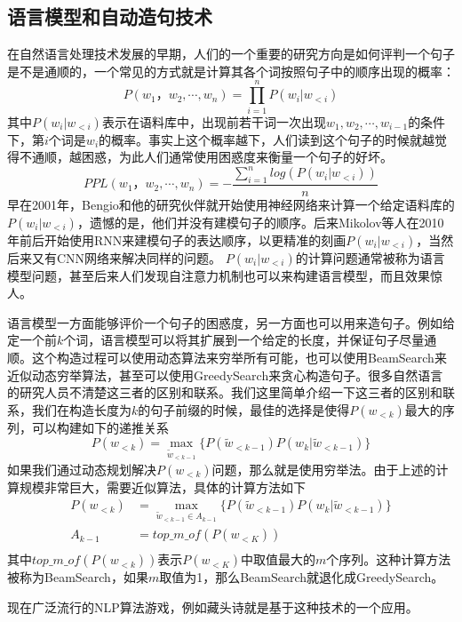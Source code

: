 \documentclass[twoside,a4paper,12pt]{book}%
\begin{document}
\subsection{语言模型和自动造句技术}
在自然语言处理技术发展的早期，人们的一个重要的研究方向是如何评判一个句子是不是通顺的，一个常见的方式就是计算其各个词按照句子中的顺序出现的概率：
$$
P(w_1，w_2,\cdots,w_n) = \prod_{i=1}^{n}{P(w_i|w_{<i})}
$$
其中$P(w_i|w_{<i})$表示在语料库中，出现前若干词一次出现$w_1,w_2,\cdots,w_{i-1}$的条件下，第$i$个词是$w_i$的概率。事实上这个概率越下，人们读到这个句子的时候就越觉得不通顺，越困惑，为此人们通常使用困惑度来衡量一个句子的好坏。
$$
PPL(w_1，w_2,\cdots,w_n) = -\frac{\sum_{i=1}^{n}log(P(w_i|w_{<i}))}{n}
$$
早在2001年，Bengio和他的研究伙伴就开始使用神经网络来计算一个给定语料库的$P(w_i|w_{<i})$，遗憾的是，他们并没有建模句子的顺序。后来Mikolov等人在2010年前后开始使用\gls{RNN}来建模句子的表达顺序，以更精准的刻画$P(w_i|w_{<i})$，当然后来又有\gls{CNN}网络来解决同样的问题。
$P(w_i|w_{<i})$的计算问题通常被称为语言模型问题，甚至后来人们发现自注意力机制也可以来构建语言模型，而且效果惊人。

语言模型一方面能够评价一个句子的困惑度，另一方面也可以用来造句子。例如给定一个前$k$个词，语言模型可以将其扩展到一个给定的长度，并保证句子尽量通顺。这个构造过程可以使用动态算法来穷举所有可能，也可以使用BeamSearch来近似动态穷举算法，甚至可以使用GreedySearch来贪心构造句子。很多自然语言的研究人员不清楚这三者的区别和联系。我们这里简单介绍一下这三者的区别和联系，我们在构造长度为$k$的句子前缀的时候，最佳的选择是使得$P(w_{<k})$最大的序列，可以构建如下的递推关系
$$
P(w_{<{k}}) =\max_{\widetilde{w}_{<{k-1}}}\{P(\widetilde{w}_{<{k-1}})P(w_k|\widetilde{w}_{<{k-1}})\} 
$$
如果我们通过动态规划解决$P(w_{<k})$问题，那么就是使用穷举法。由于上述的计算规模非常巨大，需要近似算法，具体的计算方法如下
$$
\begin{aligned}
P(w_{<{k}}) &=\max_{\widetilde{w}_{<{k-1}}\in A_{k-1}}\{P(\widetilde{w}_{<{k-1}})P(w_k|\widetilde{w}_{<{k-1}})\} \\
A_{k-1} &=top\_m\_of(P(w_{<K}))\\
\end{aligned}
$$
其中$top\_m\_of(P(w_{<k}))$表示$P(w_{<K})$中取值最大的$m$个序列。这种计算方法被称为BeamSearch，如果$m$取值为1，那么BeamSearch就退化成GreedySearch。


现在广泛流行的\gls{NLP}算法游戏，例如藏头诗就是基于这种技术的一个应用。
\end{document}
